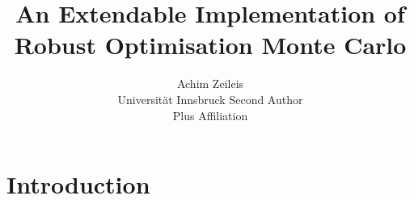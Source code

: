 \documentclass[article]{jss}
\author{Achim Zeileis\\Universit\"at Innsbruck
   \And Second Author\\Plus Affiliation}
\title{An Extendable \proglang{Python} Implementation of Robust Optimisation Monte Carlo}
\begin{document}



\section{Introduction} \label{sec:intro}




\end{document}
